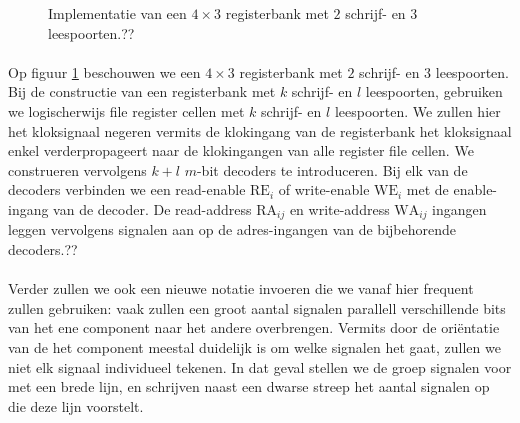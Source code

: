 \begin{figure}[hbt]
\caption{Implementatie van een $4\times 3$ registerbank met $2$ schrijf- en $3$ leespoorten.??}
\label{fig:registerbank}
\end{figure}
\paragraph{}
Op figuur \ref{fig:registerbank} beschouwen we een $4\times 3$ registerbank met $2$ schrijf- en $3$ leespoorten. Bij de constructie van een registerbank met $k$ schrijf- en $l$ leespoorten, gebruiken we logischerwijs file register cellen met $k$ schrijf- en $l$ leespoorten. We zullen hier het kloksignaal negeren vermits de klokingang van de registerbank het kloksignaal enkel verderpropageert naar de klokingangen van alle register file cellen. We construeren vervolgens $k+l$ $m$-bit decoders te introduceren. Bij elk van de decoders verbinden we een read-enable $\mbox{RE}_i$ of write-enable $\mbox{WE}_i$ met de enable-ingang van de decoder. De read-address $\mbox{RA}_{ij}$ en write-address $\mbox{WA}_{ij}$ ingangen leggen vervolgens signalen aan op de adres-ingangen van de bijbehorende decoders.??
\paragraph{}
Verder zullen we ook een nieuwe notatie invoeren die we vanaf hier frequent zullen gebruiken: vaak zullen een groot aantal signalen parallell verschillende bits van het ene component naar het andere overbrengen. Vermits door de ori\"entatie van de het component meestal duidelijk is om welke signalen het gaat, zullen we niet elk signaal individueel tekenen. In dat geval stellen we de groep signalen voor met een brede lijn, en schrijven naast een dwarse streep het aantal signalen op die deze lijn voorstelt.
